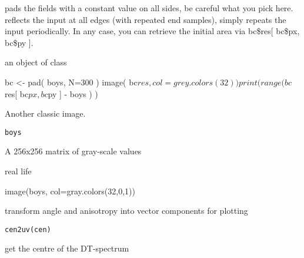 \documentclass[a4paper]{book}
\begin{document}
%
\begin{Details}\relax
{} pads the fields with a constant value on all sides, be careful what you pick here.  reflects the input at all edges (with repeated end samples),  simply repeats the input periodically. In any case, you can retrieve the initial area via bc\$res[ bc\$px, bc\$py ].
\end{Details}
%
\begin{Value}
an object of class 
\end{Value}
%
\begin{Examples}
\begin{ExampleCode}
bc <- pad( boys, N=300 )
image( bc$res, col=grey.colors(32) )
print( range( bc$res[ bc$px, bc$py ] - boys ) )
\end{ExampleCode}
\end{Examples}
%
\begin{Description}\relax
Another classic image.
\end{Description}
%
\begin{Usage}
\begin{verbatim}
boys
\end{verbatim}
\end{Usage}
%
\begin{Format}
A 256x256 matrix of gray-scale values
\end{Format}
%
\begin{Source}\relax
real life
\end{Source}
%
\begin{Examples}
\begin{ExampleCode}
image(boys, col=gray.colors(32,0,1))
\end{ExampleCode}
\end{Examples}
%
\begin{Description}\relax
transform angle and anisotropy into vector components for plotting
\end{Description}
%
\begin{Usage}
\begin{verbatim}
cen2uv(cen)
\end{verbatim}
\end{Usage}
%
\begin{Description}\relax
get the centre of the DT-spectrum
\end{Description}
\end{document}
